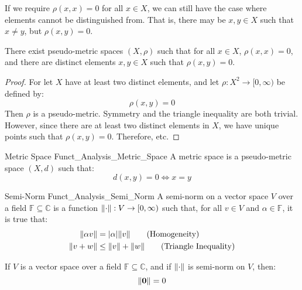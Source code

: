         If we require $\rho(x,x)=0$ for all $x\in{X}$, we
        can still have the case where elements cannot be
        distinguished from. That is, there may be
        $x,y\in{X}$ such that $x\ne{y}$, but
        $\rho(x,y)=0$.
        \begin{theorem}
            There exist pseudo-metric spaces $(X,\rho)$
            such that for all $x\in{X}$, $\rho(x,x)=0$,
            and there are distinct elements $x,y\in{X}$
            such that $\rho(x,y)=0$.
        \end{theorem}
        \begin{proof}
            For let $X$ have at least two distinct elements,
            and let $\rho:X^{2}\rightarrow[0,\infty)$
            be defined by:
            \begin{equation}
                \rho(x,y)=0
            \end{equation}
            Then $\rho$ is a pseudo-metric. Symmetry and
            the triangle inequality are both trivial.
            However, since there are at least two distinct
            elements in $X$, we have unique points such that
            $\rho(x,y)=0$. Therefore, etc.
        \end{proof}
        \begin{ldefinition}{Metric Space}
              {Funct_Analysis_Metric_Space}
            A metric space is a pseudo-metric space $(X,d)$
            such that:
            \begin{equation}
                d(x,y)=0\Longleftrightarrow{x}=y
                \tag{Definiteness}
            \end{equation}
        \end{ldefinition}
        \begin{ldefinition}{Semi-Norm}
              {Funct_Analysis_Semi_Norm}
            A semi-norm on a vector space $V$ over a field
            $\mathbb{F}\subseteq\mathbb{C}$ is a function
            $\lVert\cdot\rVert:V\rightarrow[0,\infty)$ such that, for
            all $v\in{V}$ and $\alpha\in\mathbb{F}$,
            it is true that:
            \begin{align}
                \lVert\alpha{v}\rVert
                &=|\alpha|\lVert v\rVert
                \tag{Homogeneity}\\
                \lVert v+w\rVert
                &\leq\lVert v\rVert+\lVert w\rVert
                \tag{Triangle Inequality}
            \end{align}
        \end{ldefinition}
        \begin{theorem}
            If $V$ is a vector space over a field
            $\mathbb{F}\subseteq\mathbb{C}$, and if
            $\lVert\cdot\rVert$ is semi-norm on $V$, then:
            \begin{equation}
                \lVert\mathbf{0}\rVert=0
            \end{equation}
        \end{theorem}
